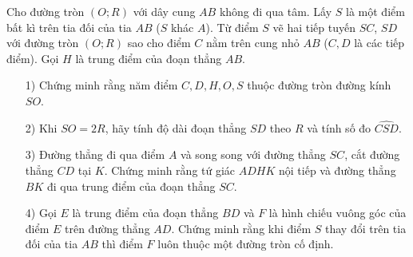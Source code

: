 \begin{ex}%
Cho đường tròn $(O;R)$ với dây cung $AB$ không đi qua tâm. Lấy $S$ là một điểm bất kì trên tia đối của tia $AB$ ($S$ khác $A$). Từ điểm $S$ vẽ hai tiếp tuyến $SC$, $SD$ với đường tròn $(O;R)$ sao cho điểm $C$ nằm trên cung nhỏ $AB$ ($C, D$ là các tiếp điểm). Gọi $H$ là trung điểm của đoạn thẳng $AB$. 
\begin{enumerate}
\item[1)] Chứng minh rằng năm điểm $C,D,H,O,S$ thuộc đường tròn đường kính $SO$. 
\item[2)] Khi $SO=2R$, hãy tính độ dài đoạn thẳng $SD$ theo $R$ và tính số đo $\widehat{CSD}$.
\item[3)] Đường thẳng đi qua điểm $A$ và song song với đường thẳng $SC$, cắt đường thẳng $CD$ tại $K$. Chứng minh rằng tứ giác $ADHK$ nội tiếp và đường thẳng $BK$ đi qua trung điểm của đoạn thẳng $SC$. 
\item[4)] Gọi $E$ là trung điểm của đoạn thẳng $BD$ và $F$ là hình chiếu vuông góc của điểm $E$ trên đường thẳng $AD$. Chứng minh rằng khi điểm $S$ thay đổi trên tia đối  của tia $AB$ thì điểm $F$ luôn thuộc một đường tròn cố định.
\end{enumerate}
\end{ex}
